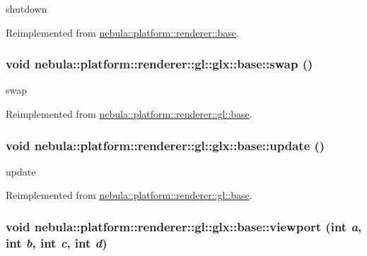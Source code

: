 shutdown 

Reimplemented from \hyperlink{classnebula_1_1platform_1_1renderer_1_1base_a679ac8cd3db96e1bce5f2b5ef00f91e1}{nebula::platform::renderer::base}.\hypertarget{classnebula_1_1platform_1_1renderer_1_1gl_1_1glx_1_1base_ae401e12e3f15975e9cf09723b3617341}{
\subsubsection[{swap}]{\setlength{\rightskip}{0pt plus 5cm}void nebula::platform::renderer::gl::glx::base::swap ()}}
\label{classnebula_1_1platform_1_1renderer_1_1gl_1_1glx_1_1base_ae401e12e3f15975e9cf09723b3617341}


swap 

Reimplemented from \hyperlink{classnebula_1_1platform_1_1renderer_1_1gl_1_1base_a99776235861491abc4fa8fc5eec7ebf9}{nebula::platform::renderer::gl::base}.\hypertarget{classnebula_1_1platform_1_1renderer_1_1gl_1_1glx_1_1base_a7d641192feb417180195053cd58dcf7d}{
\subsubsection[{update}]{\setlength{\rightskip}{0pt plus 5cm}void nebula::platform::renderer::gl::glx::base::update ()}}
\label{classnebula_1_1platform_1_1renderer_1_1gl_1_1glx_1_1base_a7d641192feb417180195053cd58dcf7d}


update 

Reimplemented from \hyperlink{classnebula_1_1platform_1_1renderer_1_1gl_1_1base_a9f5ba209a04711ace2516875da5c1aa3}{nebula::platform::renderer::gl::base}.\hypertarget{classnebula_1_1platform_1_1renderer_1_1gl_1_1glx_1_1base_a16cad9a3b8bb4ef8fc1e0c13652e0c2d}{
\subsubsection[{viewport}]{\setlength{\rightskip}{0pt plus 5cm}void nebula::platform::renderer::gl::glx::base::viewport (int {\em a}, \/  int {\em b}, \/  int {\em c}, \/  int {\em d})}}
\label{classnebula_1_1platform_1_1renderer_1_1gl_1_1glx_1_1base_a16cad9a3b8bb4ef8fc1e0c13652e0c2d}


